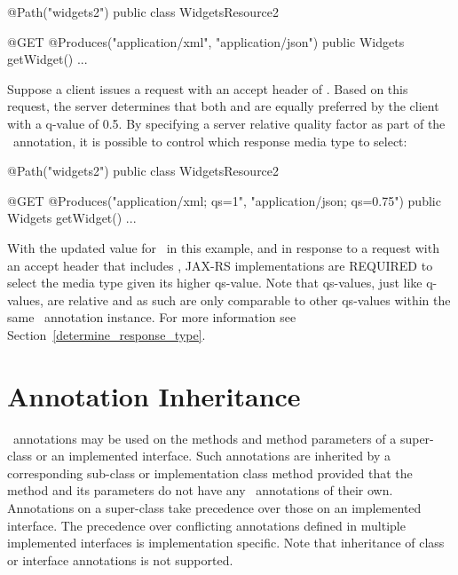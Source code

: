 \begin{listing}{1}
@Path("widgets2")
public class WidgetsResource2 {
  
  @GET
  @Produces("application/xml", "application/json")
  public Widgets getWidget() {...}

}
\end{listing}

Suppose a client issues a  request with an accept header of . Based on this request, the server determines that both  and  are equally preferred by the client with a q-value of 0.5. By specifying a server relative quality factor as part of the \Produces\ annotation, it is possible to control which response media type to select:

\begin{listing}{1}
@Path("widgets2")
public class WidgetsResource2 {
  
  @GET
  @Produces("application/xml; qs=1", "application/json; qs=0.75")
  public Widgets getWidget() {...}

}
\end{listing}

With the updated value for \Produces\ in this example, and in response to a  request with an accept header that includes , JAX-RS implementations are REQUIRED to select the media type  given its higher qs-value. Note that qs-values, just like q-values, are relative and as such are only comparable to other qs-values within the same \Produces\ annotation instance. For more information see Section~\ref{determine_response_type}.

\section{Annotation Inheritance}
\label{annotationinheritance}

\jaxrs\ annotations may be used on the methods and method parameters of a super-class or an implemented interface. Such annotations are inherited by a corresponding sub-class or implementation class method provided that the method and its parameters do not have any \jaxrs\ annotations of their own. Annotations on a super-class take precedence over those on an implemented interface. The precedence over conflicting annotations defined in multiple implemented interfaces is implementation specific. Note that inheritance of class or interface annotations is not supported.

